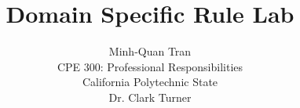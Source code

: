 \documentclass[12pt]{article}
\title{\vfill Domain Specific Rule Lab
}
\author{Minh-Quan Tran\\
\normalsize{CPE 300: Professional Responsibilities}\\
\normalsize{California Polytechnic State}\\
\normalsize{Dr. Clark Turner}
}
\begin{document}
\maketitle

\begin{multicols}{2}





\end{multicols}



\end{document}

